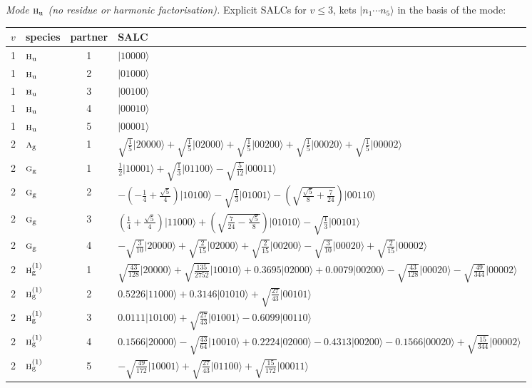 \documentclass[11pt]{article}
\newcommand{\irr}[1]{\text{\normalfont\scshape #1}}
\newcommand{\ptag}[1]{\mathrm{#1}}
\newcommand{\occ}[1]{\lvert #1\rangle}
\begin{document}
\emph{Mode $\irr{h}_{\ptag{u}}$ (no residue or harmonic factorisation).} Explicit SALCs for $v\le3$, kets $\occ{n_1\cdots n_{5}}$ in the basis of the mode:
\begin{longtable}{c l c p{}}\hline $v$ & species & partner & SALC\\ \hline\endhead
1 & $\irr{h}_{\ptag{u}}$ & 1 & $\occ{10000}$\\
1 & $\irr{h}_{\ptag{u}}$ & 2 & $\occ{01000}$\\
1 & $\irr{h}_{\ptag{u}}$ & 3 & $\occ{00100}$\\
1 & $\irr{h}_{\ptag{u}}$ & 4 & $\occ{00010}$\\
1 & $\irr{h}_{\ptag{u}}$ & 5 & $\occ{00001}$\\
\hline
2 & $\irr{a}_{\ptag{g}}$ & 1 & $\sqrt{\tfrac{1}{5}}\occ{20000}+\sqrt{\tfrac{1}{5}}\occ{02000}+\sqrt{\tfrac{1}{5}}\occ{00200}+\sqrt{\tfrac{1}{5}}\occ{00020}+\sqrt{\tfrac{1}{5}}\occ{00002}$\\
2 & $\irr{g}_{\ptag{g}}$ & 1 & $\tfrac{1}{2}\occ{10001}+\sqrt{\tfrac{1}{3}}\occ{01100}-\sqrt{\tfrac{5}{12}}\occ{00011}$\\
2 & $\irr{g}_{\ptag{g}}$ & 2 & $-(- \frac{1}{4} + \frac{\sqrt{5}}{4})\occ{10100}-\sqrt{\tfrac{1}{3}}\occ{01001}-(\sqrt{\frac{\sqrt{5}}{8} + \frac{7}{24}})\occ{00110}$\\
2 & $\irr{g}_{\ptag{g}}$ & 3 & $(\frac{1}{4} + \frac{\sqrt{5}}{4})\occ{11000}+(\sqrt{\frac{7}{24} - \frac{\sqrt{5}}{8}})\occ{01010}-\sqrt{\tfrac{1}{3}}\occ{00101}$\\
2 & $\irr{g}_{\ptag{g}}$ & 4 & $-\sqrt{\tfrac{3}{10}}\occ{20000}+\sqrt{\tfrac{2}{15}}\occ{02000}+\sqrt{\tfrac{2}{15}}\occ{00200}-\sqrt{\tfrac{3}{10}}\occ{00020}+\sqrt{\tfrac{2}{15}}\occ{00002}$\\
2 & $\irr{h}_{\ptag{g}}^{(1)}$ & 1 & $\sqrt{\tfrac{43}{128}}\occ{20000}+\sqrt{\tfrac{135}{2752}}\occ{10010}+0.3695\occ{02000}+0.0079\occ{00200}-\sqrt{\tfrac{43}{128}}\occ{00020}-\sqrt{\tfrac{49}{344}}\occ{00002}$\\
2 & $\irr{h}_{\ptag{g}}^{(1)}$ & 2 & $0.5226\occ{11000}+0.3146\occ{01010}+\sqrt{\tfrac{27}{43}}\occ{00101}$\\
2 & $\irr{h}_{\ptag{g}}^{(1)}$ & 3 & $0.0111\occ{10100}+\sqrt{\tfrac{27}{43}}\occ{01001}-0.6099\occ{00110}$\\
2 & $\irr{h}_{\ptag{g}}^{(1)}$ & 4 & $0.1566\occ{20000}-\sqrt{\tfrac{43}{64}}\occ{10010}+0.2224\occ{02000}-0.4313\occ{00200}-0.1566\occ{00020}+\sqrt{\tfrac{15}{344}}\occ{00002}$\\
2 & $\irr{h}_{\ptag{g}}^{(1)}$ & 5 & $-\sqrt{\tfrac{49}{172}}\occ{10001}+\sqrt{\tfrac{27}{43}}\occ{01100}+\sqrt{\tfrac{15}{172}}\occ{00011}$\\

\end{longtable}
\end{document}
